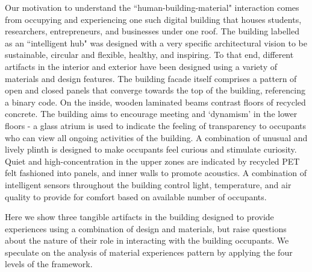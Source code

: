 \documentclass[manuscript, anonymous, review]{acmart}
\begin{document}


Our motivation to understand the ``human-building-material" interaction comes from occupying and experiencing one such digital building that houses students, researchers, entrepreneurs, and businesses under one roof. The building labelled as an ``intelligent hub" was designed with a very specific architectural vision to be sustainable, circular and flexible, healthy, and inspiring. To that end, different artifacts in the interior and exterior have been designed using a variety of materials and design features. The building facade itself comprises a pattern of open and closed panels that converge towards the top of the building, referencing a binary code. On the inside, wooden laminated beams contrast floors of recycled concrete. The building aims to encourage meeting and ‘dynamism’ in the lower floors - a glass atrium is used to indicate the feeling of transparency to occupants who can view all ongoing activities of the building. A combination of unusual and lively plinth is designed to make occupants feel curious and stimulate curiosity. Quiet and high-concentration in the upper zones are indicated by recycled PET felt fashioned into panels, and inner walls to promote acoustics. A combination of intelligent sensors throughout the building control light, temperature, and air quality to provide for comfort based on available number of occupants. 


Here we show three tangible artifacts in the building designed to provide experiences using a combination of design and materials, but raise questions about the nature of their role in interacting with the building occupants. We speculate on the analysis of material experiences pattern by applying the four levels of the framework.
\end{document}
